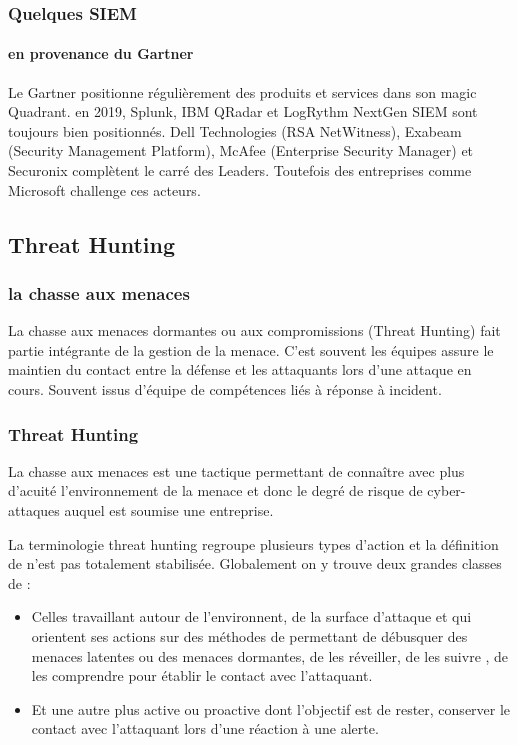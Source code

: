\begin{frame}
\frametitle<presentation>{Quelques SIEM}
\framesubtitle<presentation>{en provenance du Gartner}
Le Gartner positionne régulièrement des produits et services dans son magic Quadrant. en 2019, Splunk, IBM QRadar et LogRythm NextGen SIEM sont toujours bien positionnés.
Dell Technologies (RSA NetWitness), Exabeam (Security Management Platform), McAfee (Enterprise Security Manager) et Securonix complètent le carré des Leaders.
Toutefois des entreprises comme Microsoft challenge ces acteurs.
\end{frame}




\subsection{Threat Hunting}

\subsubsection{la chasse aux menaces}

La chasse aux menaces dormantes ou aux compromissions (Threat Hunting) fait partie intégrante de la gestion de la menace. 
C'est souvent les équipes  assure le maintien du contact entre la défense et les attaquants lors d'une attaque en cours. Souvent issus d'équipe de compétences liés à réponse à incident.


\begin{frame}
\frametitle<presentation>{Threat Hunting}
La chasse aux menaces est une tactique permettant de connaître avec plus d'acuité l'environnement de la menace et donc  le degré de risque de cyber-attaques auquel est soumise une entreprise. 

La terminologie threat hunting regroupe plusieurs types d'action et la définition de n'est pas totalement stabilisée. Globalement on y trouve deux grandes classes de  :

\begin{itemize}
  \item Celles travaillant autour de l'environnent, de la surface d'attaque et qui orientent ses actions sur des méthodes de  permettant de débusquer des menaces latentes ou des menaces dormantes, de les réveiller, de les suivre , de les comprendre pour établir le contact avec l'attaquant.

  \item Et une autre plus active ou proactive dont l'objectif est de rester, conserver le contact avec l'attaquant lors d'une réaction à une alerte.
\end{itemize}


\end{frame}


